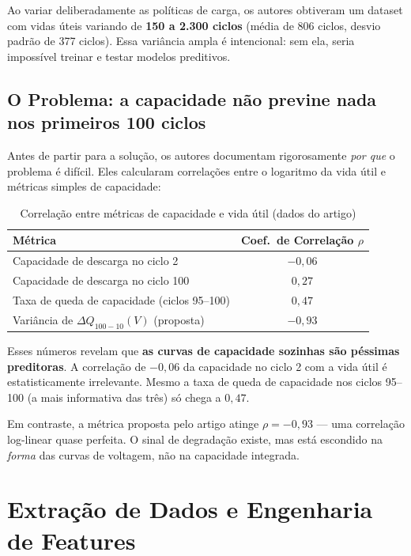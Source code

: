 \documentclass[12pt,a4paper]{article}
\begin{document}
Ao variar deliberadamente as pol\'{i}ticas de carga, os autores obtiveram um
dataset com vidas \'{u}teis variando de \textbf{150 a 2.300 ciclos}
(m\'{e}dia de 806 ciclos, desvio padr\~ao de 377 ciclos). Essa vari\^{a}ncia ampla
\'{e} intencional: sem ela, seria imposs\'{i}vel treinar e testar modelos preditivos.

\subsection{O Problema: a capacidade n\~ao previne nada nos primeiros 100 ciclos}

Antes de partir para a solu\c{c}\~ao, os autores documentam rigorosamente
\textit{por que} o problema \'{e} dif\'{i}cil. Eles calcularam correla\c{c}\~oes entre
o logaritmo da vida \'{u}til e m\'{e}tricas simples de capacidade:

\begin{table}[H]
\centering
\caption{Correla\c{c}\~ao entre m\'{e}tricas de capacidade e vida \'{u}til (dados do artigo)}
\begin{tabular}{@{}lc@{}}
\toprule
\textbf{M\'{e}trica} & \textbf{Coef.\ de Correla\c{c}\~ao $\rho$} \\
\midrule
Capacidade de descarga no ciclo 2              & $-0{,}06$ \\
Capacidade de descarga no ciclo 100            & $0{,}27$ \\
Taxa de queda de capacidade (ciclos 95--100)   & $0{,}47$ \\
Vari\^{a}ncia de $\Delta Q_{100-10}(V)$ (proposta) & $-0{,}93$ \\
\bottomrule
\end{tabular}
\end{table}

Esses n\'{u}meros revelam que \textbf{as curvas de capacidade sozinhas s\~ao p\'{e}ssimas
preditoras}. A correla\c{c}\~ao de $-0,06$ da capacidade no ciclo 2 com a vida
\'{u}til \'{e} estatisticamente irrelevante. Mesmo a taxa de queda de capacidade
nos ciclos 95--100 (a mais informativa das tr\^{e}s) s\'{o} chega a $0,47$.

Em contraste, a m\'{e}trica proposta pelo artigo atinge $\rho = -0,93$ ---
uma correla\c{c}\~ao log-linear quase perfeita. O sinal de degrada\c{c}\~ao existe,
mas est\'{a} escondido na \textit{forma} das curvas de voltagem, n\~ao na
capacidade integrada.

\section{Extra\c{c}\~ao de Dados e Engenharia de Features}
\end{document}
